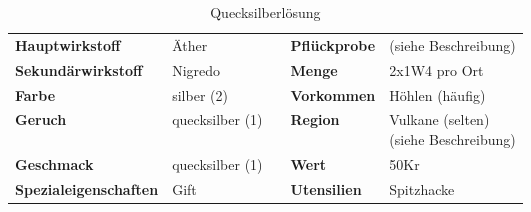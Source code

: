 \begin{table}[h] 
\begin{center} 
\begin{tabular}{|l|l|p{1cm}|l|l|} 
  	\cline{1-2} \cline{4-5} 
  	\textbf{Hauptwirkstoff} & Äther && \textbf{Pflückprobe} & (siehe Beschreibung) \\ \cline{1-2} \cline{4-5} 
  	\textbf{Sekundärwirkstoff} & Nigredo && \textbf{Menge} & 2x1W4 pro Ort \\ \cline{1-2} \cline{4-5} 
  	\textbf{Farbe} & silber (2) && \textbf{Vorkommen} & Höhlen (häufig) \\ \cline{1-2} \cline{4-5} 
  	\textbf{Geruch} & quecksilber (1) && \textbf{Region} & \brcell{Vulkane (selten) \\ (siehe Beschreibung)} \\ \cline{1-2} \cline{4-5} 
  	\textbf{Geschmack} & quecksilber (1) && \textbf{Wert} & 50Kr \\ \cline{1-2} \cline{4-5} 
  	\textbf{Spezialeigenschaften} & Gift && \textbf{Utensilien} & Spitzhacke \\ \cline{1-2} \cline{4-5} 
\end{tabular} 
\end{center} 
\caption{Quecksilberlösung} 
\label{tab:quecksilberloesung} 
\end{table}